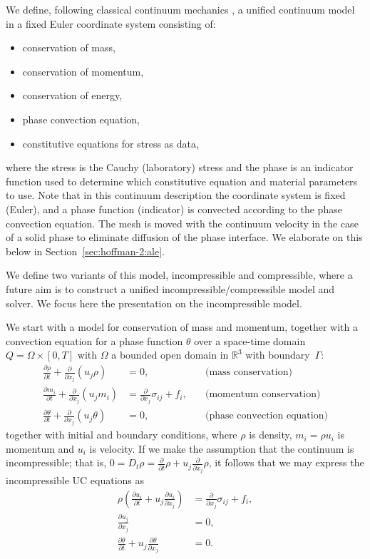 We define, following classical continuum mechanics \citep{Gurtin1981},
a unified continuum model in a fixed Euler coordinate system
consisting of:
\begin{itemize}
\item conservation of mass,
\item conservation of momentum,
\item conservation of energy,
\item phase convection equation,
\item constitutive equations for stress as data,
\end{itemize}
where the stress is the Cauchy (laboratory) stress and the phase is an
indicator function used to determine which constitutive equation and
material parameters to use. Note that in this continuum description
the coordinate system is fixed (Euler), and a phase function
(indicator) is convected according to the phase convection
equation. The mesh is moved with the continuum velocity in the case of
a solid phase to eliminate diffusion of the phase interface. We
elaborate on this below in Section~\ref{sec:hoffman-2:ale}.

We define two variants of this model, incompressible and compressible,
where a future aim is to construct a unified
incompressible/compressible model and solver. We focus here the
presentation on the incompressible model.

We start with a model for conservation of mass and momentum, together
with a convection equation for a phase function $\theta$ over a
space-time domain $Q = \Omega \times [0, T]$ with $\Omega$ a bounded
open domain in $\mathbb{R}^3$ with boundary~$\Gamma$:
\begin{align}
    \frac{\partial \rho}{\partial t} + \frac{\partial}{\partial x_j} (u_j \rho) &= 0, \quad &\text{(mass conservation)}
\\
    \frac{\partial m_i}{\partial t} + \frac{\partial}{\partial x_j} (u_j m_i) &= \frac{\partial}{\partial x_j} \sigma_{ij} + f_i, \quad &\text{(momentum conservation)}
\\
    \frac{\partial \theta}{\partial t} + \frac{\partial}{\partial x_j} (u_j \theta) &= 0, \quad &\text{(phase convection equation)}
\end{align}
together with initial and boundary conditions, where $\rho$ is
density, $m_i = \rho u_i$ is momentum and $u_i$ is velocity.  If we
make the assumption that the continuum is incompressible; that is, $0
= D_t \rho = \frac{\partial}{\partial t} \rho + u_j
\frac{\partial}{\partial x_j} \rho$, it follows that we may express
the incompressible UC equations as
\begin{align}
  \rho\left(\frac{\partial u_i}{\partial t} + u_j \frac{\partial u_i}{\partial x_j} \right) &= \frac{\partial}{\partial x_j} \sigma_{ij} + f_i,
  \\
  \frac{\partial u_j}{\partial x_j} &= 0,
  \\
  \frac{\partial\theta}{\partial t} + u_j\frac{\partial\theta}{\partial x_j} &= 0.
\end{align}

